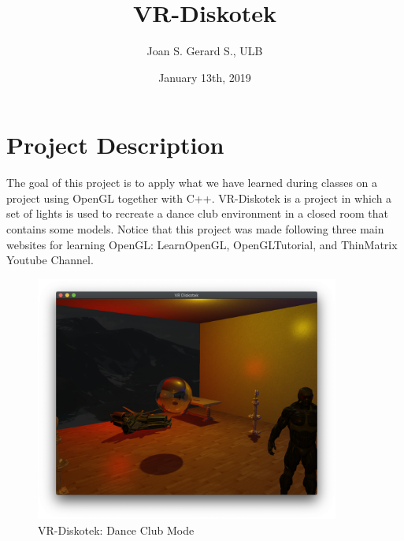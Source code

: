 \documentclass{article}
\title{VR-Diskotek}
\author{Joan S. Gerard S., ULB}
\date{January 13th, 2019}
\begin{document}
\maketitle

\section{Project Description}

The goal of this project is to apply what we have learned during classes on a project using OpenGL together with C++. VR-Diskotek is a project in which a set of lights is used to recreate a dance club environment in a closed room that contains some models. Notice that this project was made following three main websites for learning OpenGL: LearnOpenGL\cite{web:learnopengl},  OpenGLTutorial\cite{web:opengl-tuto}, and ThinMatrix Youtube Channel\cite{web:thinMatrix}.

\begin{figure}[htp]
    \centering
    \includegraphics[width=10cm]{ex.png}
    \caption{VR-Diskotek: Dance Club Mode}
    \label{fig:galaxy}
\end{figure}
\end{document}
